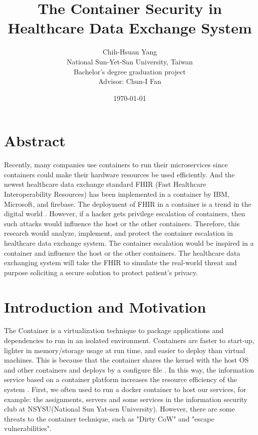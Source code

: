 \documentclass[12pt,a4paper]{article}
\title{{The Container Security in Healthcare Data Exchange System}}
\author{Chih-Hsuan Yang\\
National Sun-Yet-San University, Taiwan \\
Bachelor's degree graduation project \\
Advisor: Chun-I Fan
}
\date{\today}
\begin{document}
\section{Abstract}
Recently, many companies use containers to run their microservices since containers could
make their hardware resources be used efficiently. And the newest healthcare data exchange
standard FHIR (Fast Healthcare Interoperability Resources) \cite{FHIR_home} has been implemented
in a container by IBM, Microsoft, and firebase. The deployment of FHIR in a container is a
trend in the digital world \cite{Infrastructures}. However, if a hacker gets privilege
escalation of containers, then such attacks would influence the host or the other containers.
Therefore, this research would analyze, implement, and protect the container escalation
in healthcare data exchange system. The container escalation would be inspired in a container
and influence the host or the other containers. The healthcare data exchanging system will
take the FHIR to simulate the real-world threat and purpose soliciting a secure solution to
protect patient's privacy.


\section{Introduction and Motivation}
The Container is a virtualization technique to package applications and dependencies to run in
an isolated environment. Containers are faster to start-up, lighter in memory/storage usage
at run time, and easier to deploy than virtual machines. This is because that the container
shares the kernel with the host OS and other containers and deploys by a configure file
\cite{Offloading}. In this way, the information service based on a container platform increases
the resource efficiency of the system \cite{Comparison}.
First, we often used to run a docker container to host our services, for example: the assignments,
servers and some services in the information security club at NSYSU(National Sun Yat-sen University).
However, there are some threats to the container technique, such as "Dirty CoW" \cite{Dirty_CoW}
and "escape vulnerabilities".\\
\end{document}
